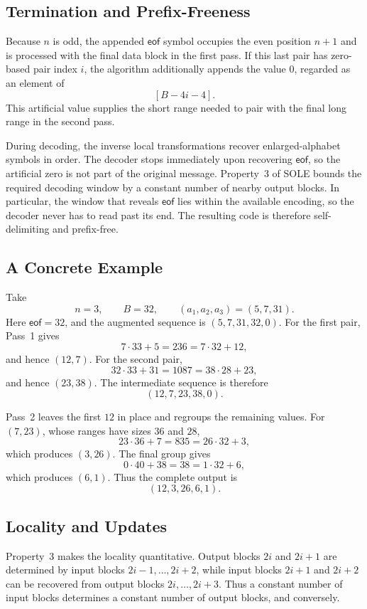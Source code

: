 \subsection{Termination and Prefix-Freeness}

Because \(n\) is odd, the appended \(\mathsf{eof}\) symbol occupies the even
position \(n+1\) and is processed with the final data block in the first pass.
If this last pair has zero-based pair index \(i\), the algorithm additionally
appends the value \(0\), regarded as an element of
\[
    [B-4i-4].
\]
This artificial value supplies the short range needed to pair with the final
long range in the second pass.

During decoding, the inverse local transformations recover enlarged-alphabet
symbols in order. The decoder stops immediately upon recovering
\(\mathsf{eof}\), so the artificial zero is not part of the original message.
Property~3 of SOLE bounds the required decoding window by a constant number of
nearby output blocks. In particular, the window that reveals
\(\mathsf{eof}\) lies within the available encoding, so the decoder never has
to read past its end. The resulting code is therefore self-delimiting and
prefix-free.

\subsection{A Concrete Example}

Take
\[
    n=3,
    \qquad
    B=32,
    \qquad
    (a_1,a_2,a_3)=(5,7,31).
\]
Here \(\mathsf{eof}=32\), and the augmented sequence is
\((5,7,31,32,0)\). For the first pair, Pass~1 gives
\[
    7\cdot 33+5=236=7\cdot 32+12,
\]
and hence \((12,7)\). For the second pair,
\[
    32\cdot 33+31=1087=38\cdot 28+23,
\]
and hence \((23,38)\). The intermediate sequence is therefore
\[
    (12,7,23,38,0).
\]

Pass~2 leaves the first \(12\) in place and regroups the remaining values.
For \((7,23)\), whose ranges have sizes \(36\) and \(28\),
\[
    23\cdot 36+7=835=26\cdot 32+3,
\]
which produces \((3,26)\). The final group gives
\[
    0\cdot 40+38=38=1\cdot 32+6,
\]
which produces \((6,1)\). Thus the complete output is
\[
    (12,3,26,6,1).
\]

\subsection{Locality and Updates}

Property~3 makes the locality quantitative. Output blocks \(2i\) and
\(2i+1\) are determined by input blocks \(2i-1,\ldots,2i+2\), while input
blocks \(2i+1\) and \(2i+2\) can be recovered from output blocks
\(2i,\ldots,2i+3\). Thus a constant number of input blocks determines a
constant number of output blocks, and conversely.

